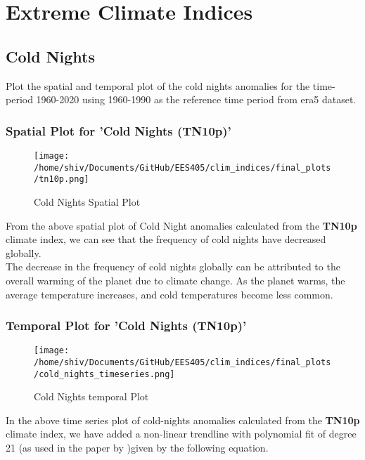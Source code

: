 \documentclass[a4paper, 12pt, twoside]{report}
\begin{document}
\newpage


\chapter{Extreme Climate Indices}\label{chap:chapter1}
\section{Cold Nights}
Plot the spatial and temporal plot of the cold nights anomalies for the time-period 1960-2020 using 1960-1990 as the reference time period from era5 dataset.\\
\subsection{Spatial Plot  for 'Cold Nights (TN10p)'}
\begin{figure}[htb]
    \centering
    \texttt{[image: /home/shiv/Documents/GitHub/EES405/clim\_indices/final\_plots/tn10p.png]}
    \caption{Cold Nights Spatial Plot}
    \label{fig:cold_nights_spatial}
\end{figure}
From the above spatial plot of Cold Night anomalies calculated from the \textbf{TN10p} climate index, we can see that the frequency of cold nights have decreased globally.\\
The decrease in the frequency of cold nights globally can be attributed to the overall warming of the planet due to climate change. As the planet warms, the average temperature increases, and cold temperatures become less common.
\subsection{Temporal Plot  for 'Cold Nights (TN10p)'}

\begin{figure}[htb]
    \centering
    \texttt{[image: /home/shiv/Documents/GitHub/EES405/clim\_indices/final\_plots/cold\_nights\_timeseries.png]}
    \caption{Cold Nights temporal Plot}
    \label{fig:cold_nights_temporal}
\end{figure}

In the above time series plot of cold-nights anomalies calculated from the \textbf{TN10p} climate index, we have added a non-linear trendline with polynomial fit of degree 21 (as used in the paper by )given by the following equation. \\
\end{document}
